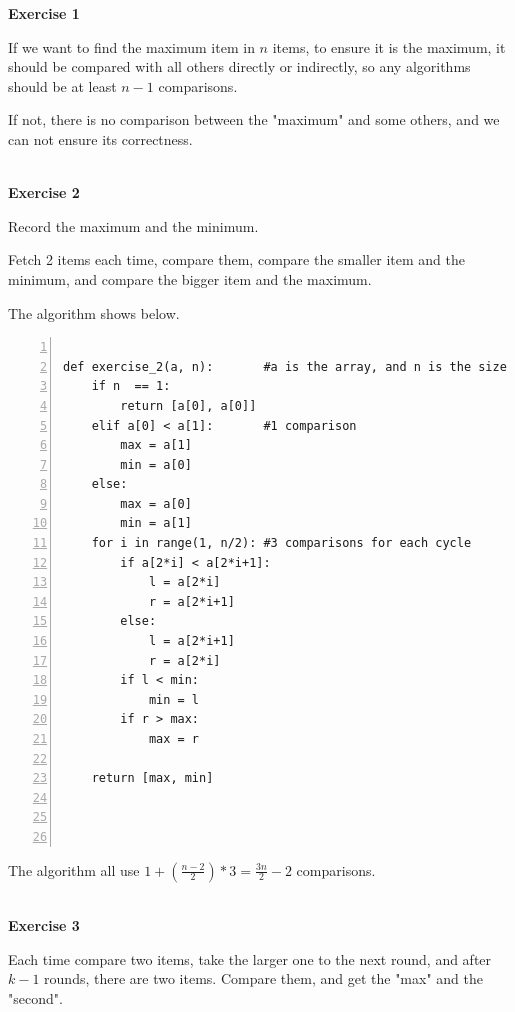\documentclass{article}
\title{Homework #2}
\author{Coffee Automaton}
\date{September 2019}
\begin{document}
\maketitle

\textbf{Exercise 1}

If we want to find the maximum item in $n$ items,  to ensure it is the maximum, it should be compared with all others directly or indirectly, so any algorithms should be at least $n-1$ comparisons. 

If not, there is no comparison between the "maximum" and some others, and we can not ensure its correctness.

~\\
\textbf{Exercise 2}

Record the maximum and the minimum.

Fetch 2 items each time, compare them, compare the smaller item and the minimum, and compare the bigger item and the maximum.

The algorithm shows below.

\begin{colorboxed}  
\begin{lstlisting}[language={[ANSI]C},numbers=left,numberstyle=\tiny,%frame=shadowbox,  
   rulesepcolor=\color{red!20!green!20!blue!20},  
   keywordstyle=\color{blue!70!black},  
   commentstyle=\color{blue!90!},  
   basicstyle=\ttfamily]  
    
def exercise_2(a, n):       #a is the array, and n is the size
    if n  == 1:
        return [a[0], a[0]]
    elif a[0] < a[1]:       #1 comparison
        max = a[1]
        min = a[0]
    else:
        max = a[0]
        min = a[1]
    for i in range(1, n/2): #3 comparisons for each cycle
        if a[2*i] < a[2*i+1]:
            l = a[2*i]
            r = a[2*i+1]
        else:
            l = a[2*i+1]
            r = a[2*i]
        if l < min:
            min = l
        if r > max:
            max = r

    return [max, min]
    
   
   
   \end{lstlisting}  
\end{colorboxed}  

The algorithm all use $1 + (\frac{n-2}{2})*3 = \frac{3n}{2} -2$ comparisons.

~\\
\textbf{Exercise 3}

Each time compare two items, take the larger one to the next round, and after $k-1$ rounds, there are two items. Compare them, and get the "max" and the "second".
\end{document}
